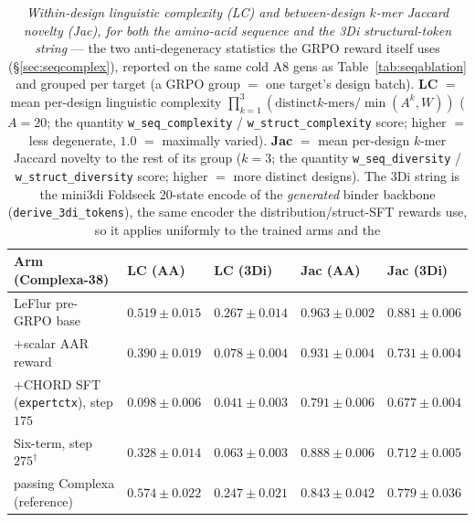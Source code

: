 \documentclass[11pt]{article}
\newcommand{\ttk}[1]{\texttt{\small #1}}
\begin{document}
\begin{table}[htbp]
\centering
{\renewcommand{\arraystretch}{1.2}%
\begin{tabular}{@{}>{\raggedright\arraybackslash}p{4.6cm}
                    >{\centering\arraybackslash}p{2.2cm}
                    >{\centering\arraybackslash}p{2.2cm}
                    >{\centering\arraybackslash}p{2.2cm}
                    >{\centering\arraybackslash}p{2.2cm}@{}}
\toprule
\textbf{Arm (Complexa-38)} & \textbf{LC (AA)} & \textbf{LC (3Di)} & \textbf{Jac (AA)} & \textbf{Jac (3Di)}\\
\midrule
LeFlur pre-GRPO base                                        & $\mathbf{0.519\pm0.015}$ & $\mathbf{0.267\pm0.014}$ & $0.963\pm0.002$ & $0.881\pm0.006$\\
$+$scalar AAR reward                                        & $0.390\pm0.019$ & $0.078\pm0.004$ & $0.931\pm0.004$ & $0.731\pm0.004$\\
\rowcolor{aTint}$+$CHORD SFT (\ttk{expertctx}), step $175$  & $0.098\pm0.006$ & $0.041\pm0.003$ & $0.791\pm0.006$ & $0.677\pm0.004$\\
\rowcolor{bTint}Six-term, step $275^\dagger$               & $0.328\pm0.014$ & $0.063\pm0.003$ & $0.888\pm0.006$ & $0.712\pm0.005$\\
passing Complexa (reference)                                & $0.574\pm0.022$ & $0.247\pm0.021$ & $0.843\pm0.042$ & $0.779\pm0.036$\\
\bottomrule
\end{tabular}}
\caption{\emph{Within-design linguistic complexity (LC) and between-design $k$-mer Jaccard novelty
(Jac), for both the amino-acid sequence and the 3Di structural-token string} --- the two
anti-degeneracy statistics the GRPO reward itself uses (\S\ref{sec:seqcomplex}), reported on the same
cold A8 gens as Table~\ref{tab:seqablation} and grouped per target (a GRPO group $=$ one target's
design batch). \textbf{LC} $=$ mean per-design linguistic complexity $\prod_{k=1}^{3}(\text{distinct
$k$-mers}/\min(A^k,W))$ ($A{=}20$; the quantity \ttk{w\_seq\_complexity} / \ttk{w\_struct\_complexity}
score; higher $=$ less degenerate, $1.0$ $=$ maximally varied). \textbf{Jac} $=$ mean per-design
$k$-mer Jaccard novelty to the rest of its group ($k{=}3$; the quantity \ttk{w\_seq\_diversity} /
\ttk{w\_struct\_diversity} score; higher $=$ more distinct designs). The 3Di string is the mini3di
Foldseek 20-state encode of the \emph{generated} binder backbone (\ttk{derive\_3di\_tokens}), the same
encoder the distribution/struct-SFT rewards use, so it applies uniformly to the trained arms and the
}
\end{table}
\end{document}
